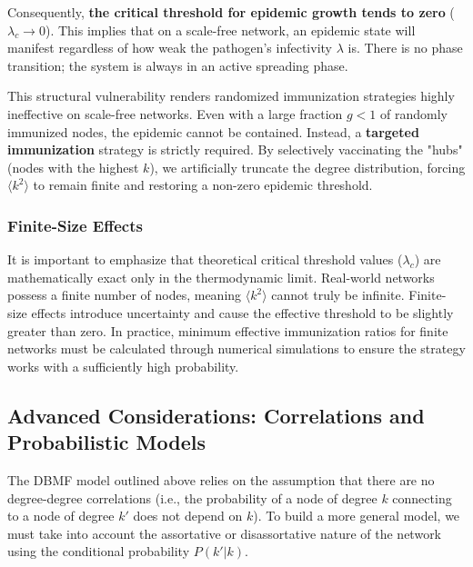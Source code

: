 Consequently, \textbf{the critical threshold for epidemic growth tends to zero} (\(\lambda_c \to 0\)). This implies that on a scale-free network, an epidemic state will manifest regardless of how weak the pathogen's infectivity \(\lambda\) is. There is no phase transition; the system is always in an active spreading phase.


This structural vulnerability renders randomized immunization strategies highly ineffective on scale-free networks. Even with a large fraction \(g < 1\) of randomly immunized nodes, the epidemic cannot be contained. Instead, a \textbf{targeted immunization} strategy is strictly required. By selectively vaccinating the "hubs" (nodes with the highest \(k\)), we artificially truncate the degree distribution, forcing \(\langle k^2 \rangle\) to remain finite and restoring a non-zero epidemic threshold.

\subsubsection{Finite-Size Effects}

It is important to emphasize that theoretical critical threshold values (\(\lambda_c\)) are mathematically exact only in the thermodynamic limit. Real-world networks possess a finite number of nodes, meaning \(\langle k^2 \rangle\) cannot truly be infinite. Finite-size effects introduce uncertainty and cause the effective threshold to be slightly greater than zero. In practice, minimum effective immunization ratios for finite networks must be calculated through numerical simulations to ensure the strategy works with a sufficiently high probability.

\subsection{Advanced Considerations: Correlations and Probabilistic Models}
\label{subsec:advanced_epidemics}

The DBMF model outlined above relies on the assumption that there are no degree-degree correlations (i.e., the probability of a node of degree \(k\) connecting to a node of degree \(k'\) does not depend on \(k\)). To build a more general model, we must take into account the assortative or disassortative nature of the network using the conditional probability \(P(k'|k)\).

